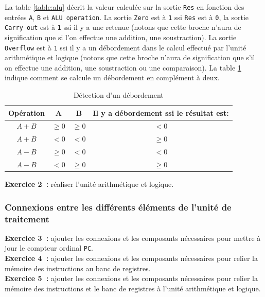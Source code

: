 \documentclass[12pt]{article}
\begin{document}
La table \ref{table:alu} décrit la valeur calculée sur la sortie \verb+Res+ en fonction des entrées \verb+A+, \verb+B+ et \verb+ALU operation+.
La sortie \verb+Zero+ est à \verb+1+ ssi \verb+Res+ est à \verb+0+, la sortie \verb+Carry out+ est à \verb+1+ ssi il y a une retenue
(notons que
cette broche n'aura de signification que si l'on effectue une addition, une soustraction).
La sortie \verb+Overflow+ est à \verb+1+ ssi il y a un débordement dans le calcul effectué par l'unité arithmétique et logique (notons que
cette broche n'aura de signification que s'il on effectue une addition, une soustraction ou une comparaison). La table \ref{table:overflow} indique comment
se calcule un débordement en complément à deux.

\begin{table}[!htpb]
\begin{center}
\begin{tabular}{|c|c|c|c|}
\hline
Opération & A & B & Il y a débordement ssi le résultat est:\\
\hline
\hline
$A+B$ & $\ge 0$ & $\ge 0$ & $< 0$\\
\hline
$A+B$ & $< 0$ & $< 0$ & $\ge 0$\\
\hline
$A-B$ & $\ge 0$ & $< 0$ & $< 0$\\
\hline
$A-B$ & $< 0$ & $\ge 0$ & $\ge 0$\\
\hline
\end{tabular}
\end{center}
\caption{Détection d'un débordement}
\label{table:overflow}
\end{table}

\textbf{Exercice 2~:} réaliser l'unité arithmétique et logique.

\subsubsection{Connexions entre les différents éléments de l'unité de traitement}

\textbf{Exercice 3~:} ajouter les connexions et les composants nécessaires pour mettre à jour le compteur
ordinal \verb+PC+.\\

\textbf{Exercice 4~:} ajouter les connexions et les composants nécessaires pour relier la mémoire des instructions
au banc de registres.\\

\textbf{Exercice 5~:} ajouter les connexions et les composants nécessaires pour relier la mémoire des instructions
et le banc de registres à l'unité arithmétique et logique.\\
\end{document}

